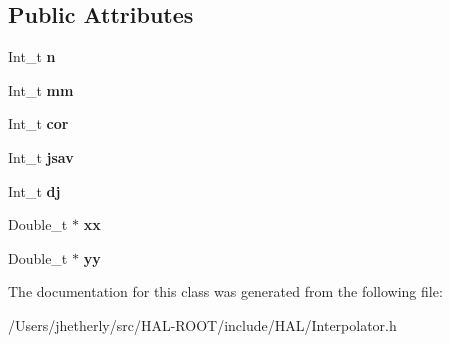 \subsection*{Public Attributes}
\begin{DoxyCompactItemize}
\item 
\hypertarget{class_h_a_l_1_1_interp_base_a70c78b7c0ba2fe8a5ac3091ebb70f1ae}{Int\+\_\+t {\bfseries n}}\label{class_h_a_l_1_1_interp_base_a70c78b7c0ba2fe8a5ac3091ebb70f1ae}

\item 
\hypertarget{class_h_a_l_1_1_interp_base_a8691b520d0856373d8763be3cf0a9082}{Int\+\_\+t {\bfseries mm}}\label{class_h_a_l_1_1_interp_base_a8691b520d0856373d8763be3cf0a9082}

\item 
\hypertarget{class_h_a_l_1_1_interp_base_acfe70f15b2295e6b2399c02802072c9c}{Int\+\_\+t {\bfseries cor}}\label{class_h_a_l_1_1_interp_base_acfe70f15b2295e6b2399c02802072c9c}

\item 
\hypertarget{class_h_a_l_1_1_interp_base_a76921f15cd1908cdbe5bcc6afeb1ecc4}{Int\+\_\+t {\bfseries jsav}}\label{class_h_a_l_1_1_interp_base_a76921f15cd1908cdbe5bcc6afeb1ecc4}

\item 
\hypertarget{class_h_a_l_1_1_interp_base_af433768e4c59a1209919246ecb991c86}{Int\+\_\+t {\bfseries dj}}\label{class_h_a_l_1_1_interp_base_af433768e4c59a1209919246ecb991c86}

\item 
\hypertarget{class_h_a_l_1_1_interp_base_acdfb5ae98e96886c9055f36d29ebd25e}{Double\+\_\+t $\ast$ {\bfseries xx}}\label{class_h_a_l_1_1_interp_base_acdfb5ae98e96886c9055f36d29ebd25e}

\item 
\hypertarget{class_h_a_l_1_1_interp_base_a49d9cd794e1c97a0ed3f3bab3a999b8b}{Double\+\_\+t $\ast$ {\bfseries yy}}\label{class_h_a_l_1_1_interp_base_a49d9cd794e1c97a0ed3f3bab3a999b8b}

\end{DoxyCompactItemize}


The documentation for this class was generated from the following file\+:\begin{DoxyCompactItemize}
\item 
/\+Users/jhetherly/src/\+H\+A\+L-\/\+R\+O\+O\+T/include/\+H\+A\+L/Interpolator.\+h\end{DoxyCompactItemize}
